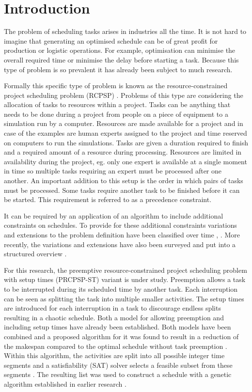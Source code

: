 \section{Introduction}
The problem of scheduling tasks arises in industries all the time. It is not hard to imagine that generating an optimised schedule can be of great profit for production or logistic operations. For example, optimisation can minimise the overall required time or minimise the delay before starting a task. Because this type of problem is so prevalent it has already been subject to much research.

Formally this specific type of problem is known as the resource-constrained project scheduling problem (RCPSP) \cite{RN69, RN66, RN70}. Problems of this type are considering the allocation of tasks to resources within a project. Tasks can be anything that needs to be done during a project from people on a piece of equipment to a simulation run by a computer. Resources are made available for a project and in case of the examples are human experts assigned to the project and time reserved on computers to run the simulations. Tasks are given a duration required to finish and a required amount of a resource during processing. Resources are limited in availability during the project, eg. only one expert is available at a single moment in time so multiple tasks requiring an expert must be processed after one another. An important addition to this setup is the order in which pairs of tasks must be processed. Some tasks require another task to be finished before it can be started. This requirement is referred to as a precedence constraint.

It can be required by an application of an algorithm to include additional constraints on schedules. To provide for these additional constraints variations and extensions to the problem definition have been classified over time \cite{RN9}, \cite{RN10}. More recently, the variations and extensions have also been surveyed and put into a structured overview \cite{RN6}.


For this research, the preemptive resource-constrained project scheduling problem with setup times (PRCPSP-ST) variant is under study. Preemption allows a task to be interrupted during its scheduled time by another task. Each interruption can be seen as splitting the task into multiple smaller activities. The setup times are introduced for each interruption in a task to discourage endless splits resulting in a chaotic schedule. Both a model for allowing preemption \cite{RN21} and including setup times \cite{RN13} have already been established. Both models have been combined and a proposed algorithm for it was found to result in a reduction of the makespan compared to the optimal schedule without task preemption \cite{RN1}. Within this algorithm, the activities are split into all possible integer time segments and a satisfiability (SAT) solver selects a feasible subset from these segments \cite{RN3}. The resulting list was used to construct a schedule with a genetic algorithm established in earlier research \cite{RN14}.

